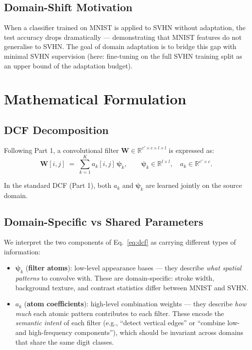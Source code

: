 \documentclass[11pt,letterpaper]{article}
\newcommand{\R}{\mathbb{R}}
\newcommand{\W}{\mathbf{W}}
\newcommand{\psivec}{\boldsymbol{\psi}}
\begin{document}
\subsection{Domain-Shift Motivation}

When a classifier trained on MNIST is applied to SVHN without adaptation, the
test accuracy drops dramatically — demonstrating that MNIST features do not
generalise to SVHN.  The goal of domain adaptation is to bridge this gap with
minimal SVHN supervision (here: fine-tuning on the full SVHN training split as
an upper bound of the adaptation budget).

\section{Mathematical Formulation}
\label{sec:math}

\subsection{DCF Decomposition}

Following Part 1, a convolutional filter $\W \in \R^{c'{\times}c{\times}l{\times}l}$
is expressed as:
\begin{equation}
  \W[i,j] \;=\; \sum_{k=1}^{K} a_k[i,j]\,\psivec_k,
  \qquad
  \psivec_k \in \R^{l \times l}, \quad a_k \in \R^{c' \times c}.
  \label{eq:dcf}
\end{equation}

In the standard DCF (Part 1), both $a_k$ and $\psivec_k$ are learned jointly
on the source domain.

\subsection{Domain-Specific vs Shared Parameters}

We interpret the two components of Eq.~\eqref{eq:dcf} as carrying different
types of information:

\begin{itemize}[leftmargin=*]
  \item $\psivec_k$ (\textbf{filter atoms}): low-level appearance bases —
        they describe \emph{what spatial patterns} to convolve with.
        These are domain-specific: stroke width, background texture, and
        contrast statistics differ between MNIST and SVHN.

  \item $a_k$ (\textbf{atom coefficients}): high-level combination weights —
        they describe \emph{how much} each atomic pattern contributes to each
        filter.  These encode the \emph{semantic intent} of each filter
        (e.g., ``detect vertical edges'' or ``combine low- and high-frequency
        components''), which should be invariant across domains that share the
        same digit classes.
\end{itemize}
\end{document}
